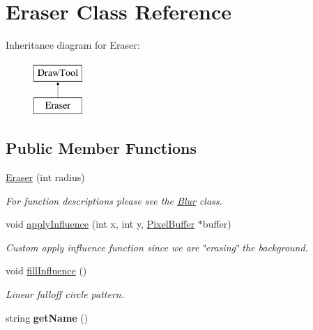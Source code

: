 \hypertarget{classEraser}{}\section{Eraser Class Reference}
\label{classEraser}
Inheritance diagram for Eraser\+:\begin{figure}[H]
\begin{center}
\leavevmode
\includegraphics[height=2.000000cm]{classEraser}
\end{center}
\end{figure}
\subsection*{Public Member Functions}
\begin{DoxyCompactItemize}
\item 
\hyperlink{classEraser_a60abccb4522452a4cdfb714eafbc9c16}{Eraser} (int radius)
\begin{DoxyCompactList}\small\item\em For function descriptions please see the \hyperlink{classBlur}{Blur} class. \end{DoxyCompactList}\item 
void \hyperlink{classEraser_a195eeec6843317ee33e0e51fccb3daff}{apply\+Influence} (int x, int y, \hyperlink{classPixelBuffer}{Pixel\+Buffer} $\ast$buffer)\hypertarget{classEraser_a195eeec6843317ee33e0e51fccb3daff}{}\label{classEraser_a195eeec6843317ee33e0e51fccb3daff}

\begin{DoxyCompactList}\small\item\em Custom apply influence function since we are \char`\"{}erasing\char`\"{} the background. \end{DoxyCompactList}\item 
void \hyperlink{classEraser_ad718ebd5796e0a83dbd94aa4f0ce2921}{fill\+Influence} ()\hypertarget{classEraser_ad718ebd5796e0a83dbd94aa4f0ce2921}{}\label{classEraser_ad718ebd5796e0a83dbd94aa4f0ce2921}

\begin{DoxyCompactList}\small\item\em Linear falloff circle pattern. \end{DoxyCompactList}\item 
string {\bfseries get\+Name} ()\hypertarget{classEraser_ac83b9aa44690af5d4043bce157a8ff3d}{}\label{classEraser_ac83b9aa44690af5d4043bce157a8ff3d}

\end{DoxyCompactItemize}
